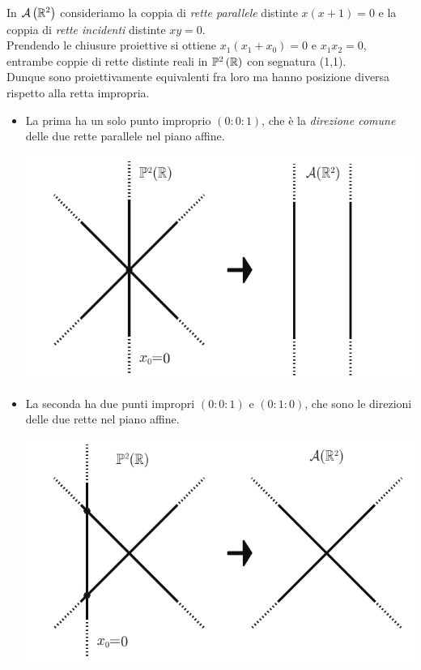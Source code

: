 \begin{example}
	In ${\mathcal{A}\left(\mathbb{R}^2\right)}$ consideriamo la coppia di \textit{rette parallele} distinte $x(x+1)=0$ e la coppia di \textit{rette incidenti} distinte $xy=0$.\\
	Prendendo le chiusure proiettive si ottiene $x_1(x_1+x_0)=0$ e $x_1x_2=0$, entrambe coppie di rette distinte reali in $\proj[2]{\realset}$ con segnatura (1,1). \\
	Dunque sono proiettivamente equivalenti fra loro ma hanno posizione diversa rispetto alla retta impropria.
	\begin{itemize}
		\item La prima ha un solo punto improprio $(0\colon 0\colon 1)$, che è la \textit{direzione comune} delle due rette parallele nel piano affine.
		\begin{center}
			\includegraphics[trim=0cm 0cm 0cm 0cm,clip,scale=0.50]{images/projlineintersect1.pdf}
		\end{center}
		\item La seconda ha due punti impropri $(0\colon 0\colon 1)$ e $(0\colon 1\colon 0)$, che sono le direzioni delle due rette nel piano affine.
		\begin{center}
			\includegraphics[trim=0cm 0cm 0cm 0cm,clip,scale=0.50]{images/projlineintersect2.pdf}
		\end{center}
	\end{itemize}
\vspace{-3mm}
\end{example}

